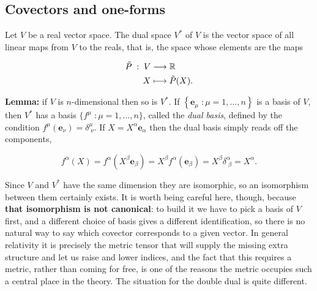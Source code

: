     \subsection{Covectors and one-forms}

        \begin{myDef}
            Let $V$ be a real vector space. The dual space $V^*$ of $V$ is the vector space of all linear maps from $V$ to the reals, that is, the space whose elements are the maps

            \begin{equation}
                \begin{split}
                    \Tilde{P}\;:\;V &\longrightarrow \mathbb{R}\\
                    X &\longmapsto \Tilde{P}(X).
                \end{split}
            \end{equation}
        \end{myDef}

        \textbf{Lemma:} if $V$ is $n$-dimensional then so is $V^*$. If $\left\{\mathbf{e}_{\mu}\;: \mu = 1,...,n\right\}$ is a basis of $V$, then $V^*$ has a basis $\{f^{\mu}\;:\mu=1,...,n\}$, called the \textit{dual basis}, defined by the condition $f^{\mu}(\mathbf{e}_{\nu}) = \delta^{\mu}_{\;\nu}$. If $X = X^{\alpha}\mathbf{e}_{\alpha}$ then the dual basis simply reads off the components,

        \begin{equation}
            f^{\alpha}(X) = f^{\alpha}\left(X^{\beta}\mathbf{e}_{\beta}\right) = X^{\beta}f^{\alpha}(\mathbf{e}_{\beta}) = X^{\beta}\delta^{\alpha}_{\;\beta} = X^{\alpha}.
        \end{equation}

        Since $V$ and $V^*$ have the same dimension they are isomorphic, so an isomorphism between them certainly exists. It is worth being careful here, though, because \textbf{that isomorphism is not canonical}: to build it we have to pick a basis of $V$ first, and a different choice of basis gives a different identification, so there is no natural way to say which covector corresponds to a given vector. In general relativity it is precisely the metric tensor that will supply the missing extra structure and let us raise and lower indices, and the fact that this requires a metric, rather than coming for free, is one of the reasons the metric occupies such a central place in the theory. The situation for the double dual is quite different.

